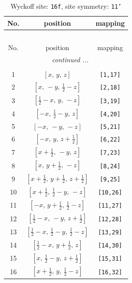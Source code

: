 \documentclass[fleqn,8pt]{jsarticle}
\begin{document}
\begin{longtable}{ccc}
\caption{Wyckoff site: {\tt 16f}, site symmetry: {\tt 11'}}
 \\
 \hline \hline
No. & position & mapping \\ \hline \endfirsthead

\multicolumn{2}{l}{\tablename\ \thetable{}} \\
 \hline \hline
No. & position & mapping \\ \hline \endhead

 \hline \hline
\multicolumn{2}{r}{\footnotesize\it continued ...} \\ \endfoot

 \hline \hline
\multicolumn{2}{r}{} \\ \endlastfoot

1 & $\left[ x,\, y,\, z \right]$ & {\tt [1,17]} \\ \hline
2 & $\left[ x,\, - y,\, \frac{1}{2} - z \right]$ & {\tt [2,18]} \\ \hline
3 & $\left[ \frac{1}{2} - x,\, y,\, - z \right]$ & {\tt [3,19]} \\ \hline
4 & $\left[ - x,\, \frac{1}{2} - y,\, z \right]$ & {\tt [4,20]} \\ \hline
5 & $\left[ - x,\, - y,\, - z \right]$ & {\tt [5,21]} \\ \hline
6 & $\left[ - x,\, y,\, z + \frac{1}{2} \right]$ & {\tt [6,22]} \\ \hline
7 & $\left[ x + \frac{1}{2},\, - y,\, z \right]$ & {\tt [7,23]} \\ \hline
8 & $\left[ x,\, y + \frac{1}{2},\, - z \right]$ & {\tt [8,24]} \\ \hline
9 & $\left[ x + \frac{1}{2},\, y + \frac{1}{2},\, z + \frac{1}{2} \right]$ & {\tt [9,25]} \\ \hline
10 & $\left[ x + \frac{1}{2},\, \frac{1}{2} - y,\, - z \right]$ & {\tt [10,26]} \\ \hline
11 & $\left[ - x,\, y + \frac{1}{2},\, \frac{1}{2} - z \right]$ & {\tt [11,27]} \\ \hline
12 & $\left[ \frac{1}{2} - x,\, - y,\, z + \frac{1}{2} \right]$ & {\tt [12,28]} \\ \hline
13 & $\left[ \frac{1}{2} - x,\, \frac{1}{2} - y,\, \frac{1}{2} - z \right]$ & {\tt [13,29]} \\ \hline
14 & $\left[ \frac{1}{2} - x,\, y + \frac{1}{2},\, z \right]$ & {\tt [14,30]} \\ \hline
15 & $\left[ x,\, \frac{1}{2} - y,\, z + \frac{1}{2} \right]$ & {\tt [15,31]} \\ \hline
16 & $\left[ x + \frac{1}{2},\, y,\, \frac{1}{2} - z \right]$ & {\tt [16,32]} \\
\end{longtable}
\end{document}
